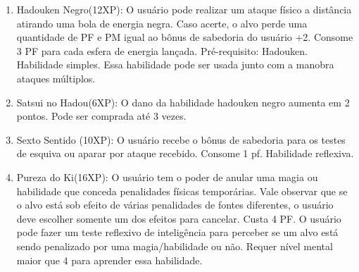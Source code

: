 \begin{enumerate}
	\item Hadouken Negro(12XP): O usuário pode realizar um ataque físico a distância atirando uma bola de energia negra. Caso acerte, o alvo perde uma quantidade de PF e PM igual ao bônus de sabedoria do usuário +2. Consome 3 PF para cada esfera de energia lançada. Pré-requisito: Hadouken. Habilidade simples. Essa habilidade pode ser usada junto com a manobra ataques múltiplos.
		
	\item Satsui no Hadou(6XP):	O dano da habilidade hadouken negro aumenta em 2 pontos. Pode ser comprada até 3 vezes.

	\item Sexto Sentido (10XP): O usuário recebe o bônus de sabedoria para os testes de esquiva ou aparar por ataque recebido. Consome 1 pf. Habilidade reflexiva.



\item Pureza do Ki(16XP): O usuário tem o poder de anular uma magia ou habilidade que conceda penalidades físicas temporárias. Vale observar que se o alvo está sob efeito de várias penalidades de fontes diferentes, o usuário deve escolher somente um dos efeitos para cancelar. Custa 4 PF. O usuário pode fazer um teste reflexivo de inteligência para perceber se um alvo está sendo penalizado por uma magia/habilidade ou não. Requer nível mental maior que 4 para aprender essa habilidade.


\end{enumerate}
